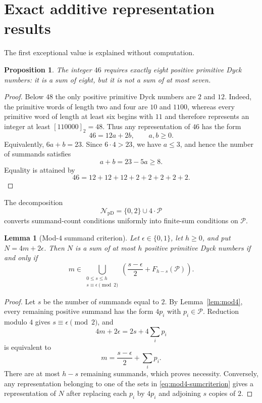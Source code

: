 \documentclass[11pt]{article}
\theoremstyle{plain}
\newtheorem{proposition}[theorem]{Proposition}
\newtheorem{lemma}[theorem]{Lemma}
\theoremstyle{definition}
\newcommand{\NpD}{\mathcal{N}_{\mathrm{pD}}}
\newcommand{\Pset}{\mathcal P}
\begin{document}
\section{Exact additive representation results}\label{sec:exceptions}

The first exceptional value is explained without computation.

\begin{proposition}\label{prop:46}
The integer $46$ requires exactly eight positive primitive Dyck numbers:
it is a sum of eight, but it is not a sum of at most seven.
\end{proposition}

\begin{proof}
Below $48$ the only positive primitive Dyck numbers are $2$ and $12$.
Indeed, the primitive words of length two and four are $10$ and $1100$,
whereas every primitive word of length at least six begins with $11$ and
therefore represents an integer at least $[110000]_2=48$.  Thus any
representation of $46$ has the form
\[
        46=12a+2b,\qquad a,b\geq0.
\]
Equivalently, $6a+b=23$.  Since $6\cdot4>23$, we have $a\leq3$, and
hence the number of summands satisfies
\[
        a+b=23-5a\geq8.
\]
Equality is attained by
\[
        46=12+12+12+2+2+2+2+2.
\]
\end{proof}


The decomposition
\[
 \NpD=\{0,2\}\cup4\cdot\Pset
\]
converts summand-count conditions uniformly into finite-sum conditions on
$\Pset$.

\begin{lemma}[Mod-$4$ summand criterion]\label{lem:mod4-sumcriterion}
Let $\epsilon\in\{0,1\}$, let $h\geq0$, and put
$N=4m+2\epsilon$.  Then $N$ is a sum of at most $h$ positive primitive
Dyck numbers if and only if
\begin{equation}\label{eq:mod4-sumcriterion}
 m\in
 \bigcup_{\substack{0\leq s\leq h\\
                    s\equiv\epsilon\pmod2}}
 \left(
  \frac{s-\epsilon}{2}+F_{h-s}(\Pset)
 \right).
\end{equation}
\end{lemma}

\begin{proof}
Let $s$ be the number of summands equal to $2$.  By
Lemma~\ref{lem:mod4}, every remaining positive summand has the form
$4p_i$ with $p_i\in\Pset$.  Reduction modulo $4$ gives
$s\equiv\epsilon\pmod2$, and
\[
 4m+2\epsilon=2s+4\sum_i p_i
\]
is equivalent to
\[
 m=\frac{s-\epsilon}{2}+\sum_i p_i.
\]
There are at most $h-s$ remaining summands, which proves necessity.
Conversely, any representation belonging to one of the sets in
\eqref{eq:mod4-sumcriterion} gives a representation of $N$ after
replacing each $p_i$ by $4p_i$ and adjoining $s$ copies of $2$.
\end{proof}
\end{document}
